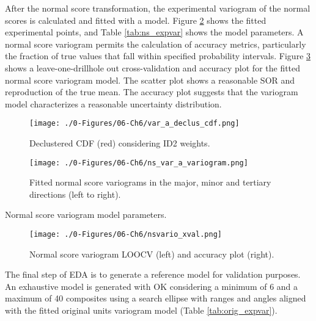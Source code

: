 After the normal score transformation, the experimental variogram of the normal scores is calculated and fitted with a model. Figure \ref{fig:ns_expvar} shows the fitted experimental points, and Table \ref{tab:ns_expvar} shows the model parameters. A normal score variogram permits the calculation of accuracy metrics, particularly the fraction of true values that fall within specified probability intervals. Figure \ref{fig:ns_xval} shows a leave-one-drillhole out cross-validation and accuracy plot for the fitted normal score variogram model. The scatter plot shows a reasonable \gls{SOR} and reproduction of the true mean. The accuracy plot suggests that the variogram model characterizes a reasonable uncertainty distribution.

\begin{figure}[htb!]
    \centering
    \texttt{[image: ./0-Figures/06-Ch6/var\_a\_declus\_cdf.png]}
    \caption{ Declustered \gls{CDF} (red) considering \gls{ID2} weights. }
    \label{fig:declus_cdf}
\end{figure}

\begin{figure}[htb!]
    \centering
    \texttt{[image: ./0-Figures/06-Ch6/ns\_var\_a\_variogram.png]}
    \caption{Fitted normal score variograms in the major, minor and tertiary directions (left to right). }
    \label{fig:ns_expvar}
\end{figure}

\begin{table}[!htb]
    \centering
    \caption{Normal score variogram model parameters.}
    \resizebox{1\width}{!}{}
    \label{tab:ns_expvar}
\end{table}

\begin{figure}[htb!]
    \centering
    \texttt{[image: ./0-Figures/06-Ch6/nsvario\_xval.png]}
    \caption{Normal score variogram \gls{LOOCV} (left) and accuracy plot (right).}
    \label{fig:ns_xval}
\end{figure}

The final step of \gls{EDA} is to generate a reference model for validation purposes. An exhaustive model is generated with \gls{OK} considering a minimum of 6 and a maximum of 40 composites using a search ellipse with ranges and angles aligned with the fitted original units variogram model (Table \ref{tab:orig_expvar}).

